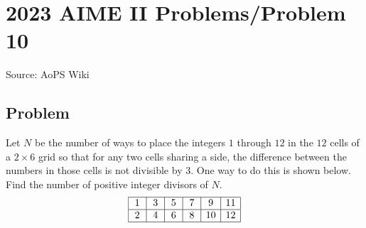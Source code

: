 \documentclass[12pt]{article}
\begin{document}
\section*{{2023 AIME II Problems/Problem 10}}
Source: AoPS Wiki

\subsection*{Problem}
Let $N$ be the number of ways to place the integers $1$ through $12$ in the $12$ cells of a $2 \times 6$ grid so that for any two cells sharing a side, the difference between the numbers in those cells is not divisible by $3.$ One way to do this is shown below. Find the number of positive integer divisors of $N.$ \[\begin{array}{|c|c|c|c|c|c|} \hline \,1\, & \,3\, & \,5\, & \,7\, & \,9\, & 11 \\ \hline \,2\, & \,4\, & \,6\, & \,8\, & 10 & 12 \\ \hline \end{array}\]
\end{document}
